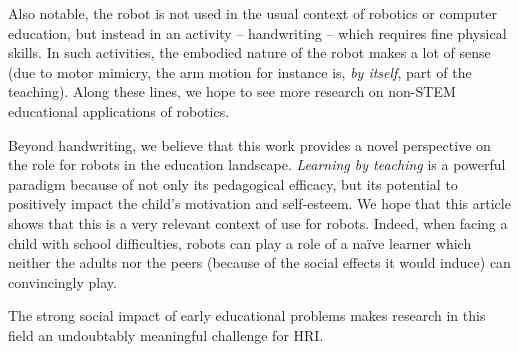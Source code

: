 \documentclass{sig-alternate}
\begin{document}
Also notable, the robot is not used in the usual context of robotics or computer
education, but instead in an activity -- handwriting -- which requires fine
physical skills. In such activities, the embodied nature of the robot makes a
lot of sense (due to motor mimicry, the arm motion for instance is, \emph{by
itself}, part of the teaching). Along these lines, we hope to see more research
on non-STEM educational applications of robotics.

Beyond handwriting, we believe that this work provides a novel perspective on
the role for robots in the education landscape. \emph{Learning by teaching} is a
powerful paradigm because of not only its pedagogical efficacy, but its
potential to positively impact the child's motivation and self-esteem. We hope that 
this article shows that this is a very relevant context of use for robots. Indeed,
when facing a child with school difficulties, robots can play a role of a na\"ive 
learner which neither the adults nor the peers (because of the social effects it would 
induce) can convincingly play.

The strong social impact of early educational problems makes research in this field
an undoubtably meaningful challenge for HRI.







\end{document}
